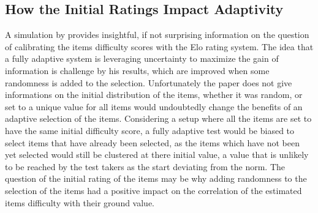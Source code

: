     \subsection{How the Initial Ratings Impact Adaptivity}
A simulation by \textcite{pelanek_applications_2016} provides insightful, if not surprising information on the question of calibrating the items difficulty scores with the Elo rating system. The idea that a fully adaptive system is leveraging uncertainty to maximize the gain of information is challenge by his results, which are improved when some randomness is added to the selection. Unfortunately the paper does not give informations on the initial distribution of the items, whether it was random, or set to a unique value for all items would undoubtedly change the benefits of an adaptive selection of the items. Considering a setup where all the items are set to have the same initial difficulty score, a fully adaptive test would be biased to select items that have already been selected, as the items which have not been yet selected would still be clustered at there initial value, a value that is unlikely to be reached by the test takers as the start deviating from the norm. The question of the initial rating of the items may be why adding randomness to the selection of the items had a positive impact on the correlation of the estimated items difficulty with their ground value.

